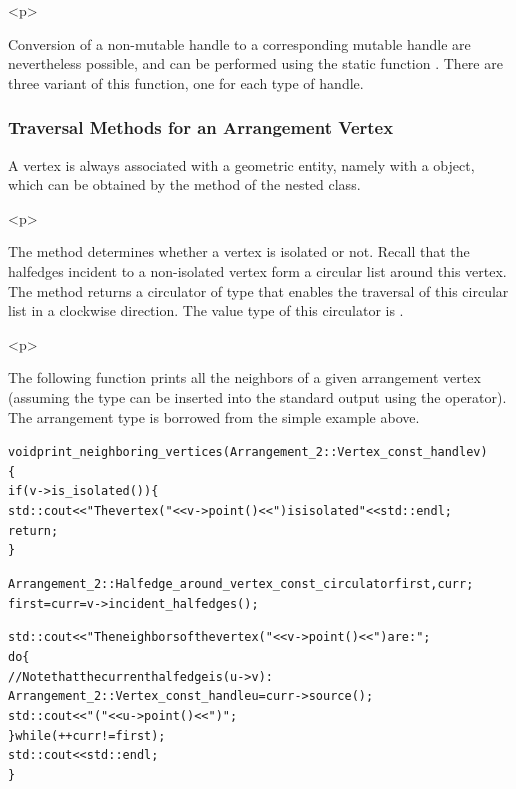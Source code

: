 \begin{ccHtmlOnly}<p>\end{ccHtmlOnly}
Conversion of a non-mutable handle to a corresponding mutable
handle are nevertheless possible, and can be performed using the
static function . There are
three variant of this function, one for each type of handle.

\subsubsection{Traversal Methods for an Arrangement Vertex}
\label{arr_sssec:tr_vertex}
%
A vertex is always associated with a geometric entity, namely with
a  object, which can be obtained by the 
method of the nested  class.

\begin{ccHtmlOnly}<p>\end{ccHtmlOnly}
The  method determines whether a vertex is isolated
or not. Recall that the halfedges incident to a non-isolated vertex
form a circular list around this vertex. The
 method returns a circulator of type
 that
enables the traversal of this circular list in a clockwise
direction. The value type of this circulator is .

\begin{ccHtmlOnly}<p>\end{ccHtmlOnly}
The following function prints all the neighbors of a given
arrangement vertex (assuming the  type can be
inserted into the standard output using the \ccc{<<} operator). The
arrangement type is borrowed from the simple example above.
\begin{alltt}
void print_neighboring_vertices (Arrangement_2::Vertex_const_handle v)
\{
  if (v->is_isolated()) \{
    std::cout << "The vertex (" << v->point() << ") is isolated" << std::endl;
    return;
  \}

  Arrangement_2::Halfedge_around_vertex_const_circulator first, curr;
  first = curr = v->incident_halfedges();

  std::cout << "The neighbors of the vertex (" << v->point() << ") are:";
  do \{
    // Note that the current halfedge is (u -> v):
    Arrangement_2::Vertex_const_handle u = curr->source();
    std::cout << " (" << u->point() << ")";
  \} while (++curr != first);
  std::cout << std::endl;
\}
\end{alltt}


